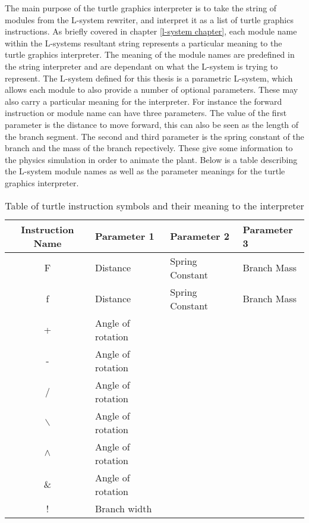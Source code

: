 The main purpose of the turtle graphics interpreter is to take the string of modules from the L-system rewriter, and interpret it as a list of turtle graphics instructions. As briefly covered in chapter \ref{l-system chapter}, each module name within the L-systems resultant string represents a particular meaning to the turtle graphics interpreter. The meaning of the module names are predefined in the string interpreter and are dependant on what the L-system is trying to represent. The L-system defined for this thesis is a parametric L-system, which allows each module to also provide a number of optional parameters. These may also carry a particular meaning for the interpreter. For instance the forward instruction or module name  can have three parameters. The value of the first parameter is the distance to move forward, this can also be seen as the length of the branch segment. The second and third parameter is the spring constant of the branch and the mass of the branch repectively. These give some information to the physics simulation in order to animate the plant. Below is a table describing the L-system module names as well as the parameter meanings for the turtle graphics interpreter.

\begin{table}[h!]
\centering
\begin{tabular}{ | c | l | l | l |}
\hline
	Instruction Name 	& Parameter 1 & Parameter 2 & Parameter 3 \\  
\hline
\hline
	F 							& Distance	& Spring Constant	& Branch Mass\\
\hline
	f 							& Distance	& Spring Constant	& Branch Mass\\
\hline
	+ 							& Angle of rotation &			&\\
\hline
	- 							& Angle	of rotation	&			&\\
\hline
	/ 							& Angle	of rotation	&			&\\
\hline
	$\backslash$ 				& Angle	of rotation	&			&\\
\hline
	$\land$ 					& Angle	of rotation	&			&\\
\hline
	\& 							& Angle	of rotation	&			&\\
\hline
	! 							& Branch width		&			&\\
\hline
\end{tabular}
\caption{Table of turtle instruction symbols and their meaning to the interpreter}
\label{instruction table 1}
\end{table}
\FloatBarrier


